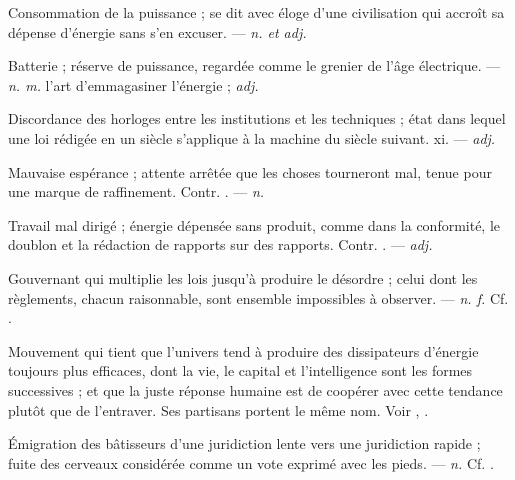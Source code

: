  Consommation de la puissance ; se dit avec éloge d'une civilisation qui accroît sa dépense d'énergie sans s'en excuser. ---  \textit{n. et adj.}

 Batterie ; réserve de puissance, regardée comme le grenier de l'âge électrique.  ---  \textit{n. m.} l'art d'emmagasiner l'énergie ;  \textit{adj.}

 Discordance des horloges entre les institutions et les techniques ; état dans lequel une loi rédigée en un siècle s'applique à la machine du siècle suivant.   xi. ---  \textit{adj.}

 Mauvaise espérance ; attente arrêtée que les choses tourneront mal, tenue pour une marque de raffinement. Contr. . ---  \textit{n.}

 Travail mal dirigé ; énergie dépensée sans produit, comme dans la conformité, le doublon et la rédaction de rapports sur des rapports. Contr. . ---  \textit{adj.}

 Gouvernant qui multiplie les lois jusqu'à produire le désordre ; celui dont les règlements, chacun raisonnable, sont ensemble impossibles à observer. ---  \textit{n. f.} Cf. .

 Mouvement qui tient que l'univers tend à produire des dissipateurs d'énergie toujours plus efficaces, dont la vie, le capital et l'intelligence sont les formes successives ; et que la juste réponse humaine est de coopérer avec cette tendance plutôt que de l'entraver. Ses partisans portent le même nom. Voir , .

 Émigration des bâtisseurs d'une juridiction lente vers une juridiction rapide ; fuite des cerveaux considérée comme un vote exprimé avec les pieds.   ---  \textit{n.} Cf. .

